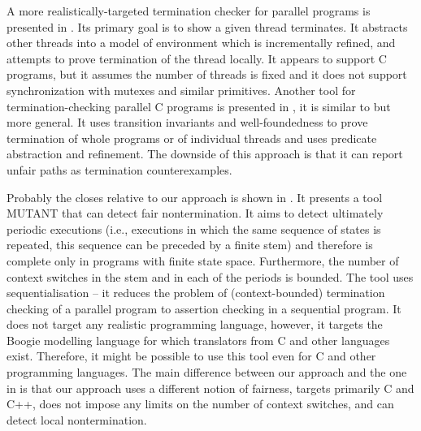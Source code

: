 
A more realistically-targeted termination checker for parallel programs is presented in .
Its primary goal is to show a given thread terminates.
It abstracts other threads into a model of environment which is incrementally refined, and attempts to prove termination of the thread locally.
It appears to support C programs, but it assumes the number of threads is fixed and it does not support synchronization with mutexes and similar primitives.
Another tool for termination-checking parallel C programs is presented in , it is similar to \cite{Cook2007thr} but more general.
It uses transition invariants and well-foundedness to prove termination of whole programs or of individual threads and uses predicate abstraction and refinement.
The downside of this approach is that it can report unfair paths as termination counterexamples.

Probably the closes relative to our approach is shown in .
It presents a tool MUTANT that can detect fair nontermination.
It aims to detect ultimately periodic executions (i.e., executions in which the same sequence of states is repeated, this sequence can be preceded by a finite stem) and therefore is complete only in programs with finite state space.
Furthermore, the number of context switches in the stem and in each of the periods is bounded.
The tool uses sequentialisation -- it reduces the problem of (context-bounded) termination checking of a parallel program to assertion checking in a sequential program.
It does not target any realistic programming language, however, it targets the Boogie modelling language for which translators from C and other languages exist.
Therefore, it might be possible to use this tool even for C and other programming languages.
The main difference between our approach and the one in \cite{Atig2012term} is that our approach uses a different notion of fairness, targets primarily C and C++, does not impose any limits on the number of context switches, and can detect local nontermination.

